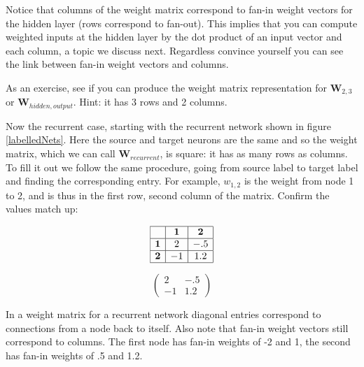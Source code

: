 \noindent Notice that columns of the weight matrix correspond to fan-in weight vectors for the hidden layer (rows correspond to fan-out). This implies that you can compute weighted inputs at the hidden layer by the dot product of an input vector and each column, a topic we discuss next. Regardless convince yourself you can see the link between fan-in weight vectors and columns. 

As an exercise, see if you can produce the weight matrix representation for $\textbf{W}_{2,3}$ or $\textbf{W}_{hidden,output}$. Hint: it has 3 rows and 2 columns. 

Now the recurrent case, starting with the recurrent network shown in figure \ref{labelledNets}. Here the source and target neurons are the same and so the weight matrix, which we can call $\textbf{W}_{recurrent}$, is square: it has as many rows as columns. To fill it out we follow the same procedure, going from source label to target label and finding the corresponding entry. For example, $w_{1,2}$ is the weight from node 1 to 2, and is thus in the first row, second column of the matrix. Confirm the values match up:

\begin{minipage}{0.5\textwidth}
\centering
\[
\begin{array}{|c|c|c|}
\hline
\multicolumn{1}{|c|}{} & \textbf{1} & \textbf{2} \\
\hline
\textbf{1} & 2 & -.5 \\
\hline
\textbf{2} & -1 & 1.2 \\
\hline
\end{array}
\]
\end{minipage}
\begin{minipage}{0.5\textwidth}
\centering
\[
\begin{pmatrix}
 2  &  -.5 \\
 -1  & 1.2 
\end{pmatrix}
\]
\end{minipage}
\vspace*{.1cm} 

\noindent In a weight matrix for a recurrent network diagonal entries correspond to connections from a node back to itself. Also note that fan-in weight vectors still correspond to columns. The first node has fan-in weights of -2 and 1, the second has fan-in weights of .5 and 1.2.

